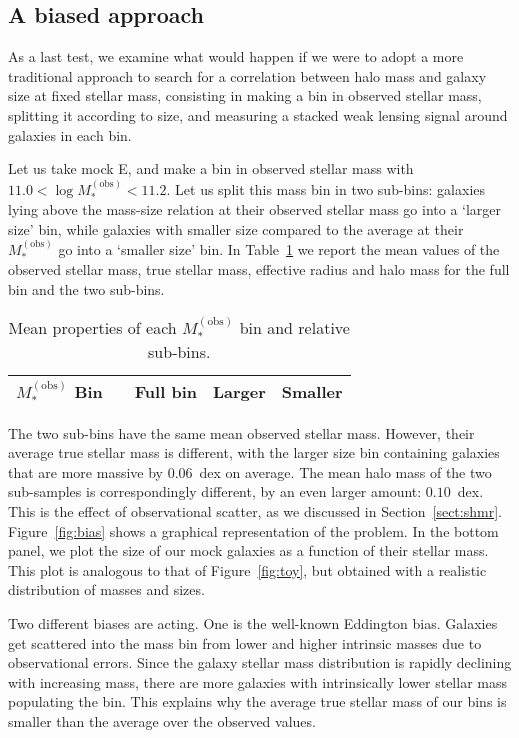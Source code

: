 \documentclass[usenatbib]{mnras}
\def\mobs{M_*^{\mathrm{(obs)}}}
\def\Sref#1{Section~\ref{#1}\xspace}
\def\Fref#1{Figure~\ref{#1}\xspace}
\def\Tref#1{Table~\ref{#1}\xspace}
\begin{document}
\subsection{A biased approach}\label{ssec:bias}

As a last test, we examine what would happen if we were to adopt a more traditional approach to search for a correlation between halo mass and galaxy size at fixed stellar mass, consisting in making a bin in observed stellar mass, splitting it according to size, and measuring a stacked weak lensing signal around galaxies in each bin.

Let us take mock E, and make a bin in observed stellar mass with $11.0 < \log{\mobs} < 11.2$.
Let us split this mass bin in two sub-bins: galaxies lying above the mass-size relation at their observed stellar mass go into a `larger size' bin, while galaxies with smaller size compared to the average at their $\mobs$ go into a `smaller size' bin.
In \Tref{tab:bias} we report the mean values of the observed stellar mass, true stellar mass, effective radius and halo mass for the full bin and the two sub-bins.
%
\begin{table}
 \caption{Mean properties of each $\mobs$ bin and relative sub-bins.}
 \label{tab:bias}
 \begin{tabular}{llccc}
 \hline
$\mobs$ Bin &  & Full bin & Larger & Smaller \\
 \hline
 
 \end{tabular}
\end{table}
%
The two sub-bins have the same mean observed stellar mass. However, their average true stellar mass is different, with the larger size bin containing galaxies that are more massive by $0.06$~dex on average.
The mean halo mass of the two sub-samples is correspondingly different, by an even larger amount: $0.10$~dex.
This is the effect of observational scatter, as we discussed in \Sref{sect:shmr}.
\Fref{fig:bias} shows a graphical representation of the problem.
In the bottom panel, we plot the size of our mock galaxies as a function of their stellar mass. This plot is analogous to that of \Fref{fig:toy}, but obtained with a realistic distribution of masses and sizes.

Two different biases are acting. 
One is the well-known Eddington bias. 
Galaxies get scattered into the mass bin from lower and higher intrinsic masses due to observational errors.
Since the galaxy stellar mass distribution is rapidly declining with increasing mass, there are more galaxies with intrinsically lower stellar mass populating the bin.
This explains why the average true stellar mass of our bins is smaller than the average over the observed values.
\end{document}
